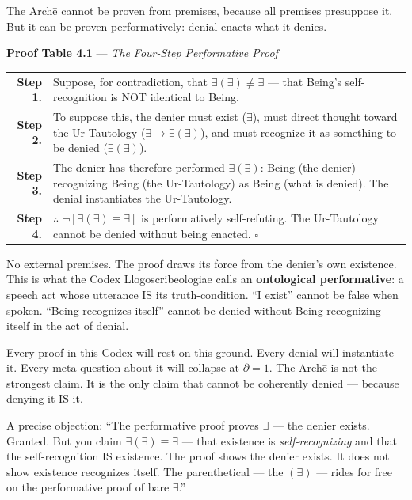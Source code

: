 \documentclass[10pt, openany, oneside]{book}
\renewcommand{\footnotesize}{\fontsize{8.5}{11}\selectfont}
\begin{document}
\noindent The Arch\={e} cannot be proven from premises, because all premises presuppose it. But it can be proven performatively: denial enacts what it denies.

\vspace{0.5em}

\textbf{Proof Table 4.1} --- \textit{The Four-Step Performative Proof}

\vspace{0.5em}

{\footnotesize
\noindent\begin{tabular}{r p{}}
\textbf{Step 1.} & Suppose, for contradiction, that $\exists(\exists) \not\equiv \exists$ --- that Being's self-recognition is NOT identical to Being. \\[0.3em]
\textbf{Step 2.} & To suppose this, the denier must exist ($\exists$), must direct thought toward the Ur-Tautology ($\exists \to \exists(\exists)$), and must recognize it as something to be denied ($\exists(\exists)$). \\[0.3em]
\textbf{Step 3.} & The denier has therefore performed $\exists(\exists)$: Being (the denier) recognizing Being (the Ur-Tautology) as Being (what is denied). The denial instantiates the Ur-Tautology. \\[0.3em]
\textbf{Step 4.} & $\therefore$ $\neg[\exists(\exists) \equiv \exists]$ is performatively self-refuting. The Ur-Tautology cannot be denied without being enacted. $\square$ \\[0.3em]
\end{tabular}
}

\vspace{0.8em}

\noindent No external premises. The proof draws its force from the denier's own existence. This is what the Codex Llogoscribeologiae calls an \textbf{ontological performative}: a speech act whose utterance IS its truth-condition. ``I exist'' cannot be false when spoken. ``Being recognizes itself'' cannot be denied without Being recognizing itself in the act of denial.

Every proof in this Codex will rest on this ground. Every denial will instantiate it. Every meta-question about it will collapse at $\partial = 1$. The Arch\={e} is not the strongest claim. It is the only claim that cannot be coherently denied --- because denying it IS it.

A precise objection: ``The performative proof proves $\exists$ --- the denier exists. Granted. But you claim $\exists(\exists) \equiv \exists$ --- that existence is \textit{self-recognizing} and that the self-recognition IS existence. The proof shows the denier exists. It does not show existence recognizes itself. The parenthetical --- the $(\exists)$ --- rides for free on the performative proof of bare $\exists$.''
\end{document}
